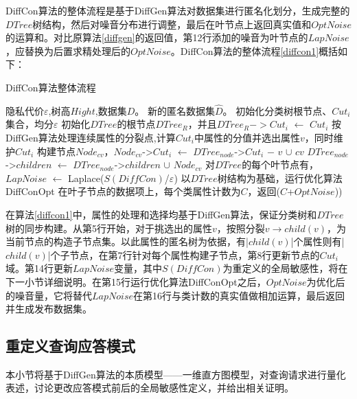 DiffCon算法的整体流程是基于DiffGen算法对数据集进行匿名化划分，生成完整的$DTree$树结构，然后对噪音分布进行调整，最后在叶节点上返回真实值和$OptNoise$的运算和。对比原算法\ref{diffgen}的返回值，第12行添加的噪音为叶节点的$LapNoise$，应替换为后置求精处理后的$OptNoise$。DiffCon算法的整体流程\ref{diffcon1}概括如下：

\begin{algorithm}
	\caption{DiffCon算法整体流程} 
	\label{diffcon1}
	\begin{algorithmic}[1]
		\REQUIRE 隐私代价$\varepsilon$,树高$Hight$,数据集$D$。
		\ENSURE 新的匿名数据集$\hat{D}$。
		\STATE 初始化分类树根节点、$Cut_{i}$集合，均分$\varepsilon$
		\STATE 初始化$DTree$的根节点$DTree_{R}$，并且$DTree_{R}->Cut_{i}$ $\leftarrow$ $Cut_{i}$
		\STATE 按DiffGen算法处理连续属性的分裂点,计算$Cut_{i}$中属性的分值并选出属性$v$，同时维护$Cut_{i}$
		\STATE 构建节点$Node_{cv}$，$Node_{cv}$->$Cut_{i}$ $\leftarrow$ $DTree_{node}$->$Cut_{i}$ $ - $ $v$ $\cup$ $cv$
		\STATE $DTree_{node}$->$children$ $\leftarrow$ $DTree_{node}$->$children$ $\cup$ $Node_{cv}$
		\ENDFOR
		\ENDIF 
		\ENDFOR
		\ENDFOR
		\STATE 对$DTree$的每个叶节点有，$LapNoise$ $\leftarrow$ Laplace($S(DiffCon)$/$\varepsilon$)
		\STATE 以$DTree$树结构为基础，运行优化算法DiffConOpt
		\RETURN 在叶子节点的数据项上，每个类属性计数为$C$，返回($C$+$OptNoise$))
	\end{algorithmic}
\end{algorithm} 

在算法\ref{diffcon1}中，属性的处理和选择均基于DiffGen算法，保证分类树和$DTree$树的同步构建。从第5行开始，对于挑选出的属性$v$，按照分裂$v$$\rightarrow$$child(v)$，为当前节点的构造子节点集。以此属性的匿名树为依据，有|$child(v)$|个属性则有|$child(v)$|个子节点，在第7行针对每个属性构建子节点，第8行更新节点的$Cut_{i}$域。第14行更新$LapNoise$变量，其中$S(DiffCon)$为重定义的全局敏感性，将在下一小节详细说明。在第15行运行优化算法DiffConOpt之后，$OptNoise$为优化后的噪音量，它将替代$LapNoise$在第16行与类计数的真实值做相加运算，最后返回并生成发布数据集。

\subsection{重定义查询应答模式}
本小节将基于DiffGen算法的本质模型——一维直方图模型，对查询请求进行量化表述，讨论更改应答模式前后的全局敏感性定义，并给出相关证明。

